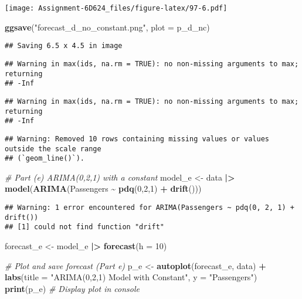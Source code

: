 \documentclass[
]{article}
\newenvironment{Shaded}{\begin{snugshade}}{\end{snugshade}}
\newcommand{\AttributeTok}[1]{\textcolor[rgb]{0.13,0.29,0.53}{#1}}
\newcommand{\CommentTok}[1]{\textcolor[rgb]{0.56,0.35,0.01}{\textit{#1}}}
\newcommand{\DecValTok}[1]{\textcolor[rgb]{0.00,0.00,0.81}{#1}}
\newcommand{\FunctionTok}[1]{\textcolor[rgb]{0.13,0.29,0.53}{\textbf{#1}}}
\newcommand{\NormalTok}[1]{#1}
\newcommand{\OtherTok}[1]{\textcolor[rgb]{0.56,0.35,0.01}{#1}}
\newcommand{\SpecialCharTok}[1]{\textcolor[rgb]{0.81,0.36,0.00}{\textbf{#1}}}
\newcommand{\StringTok}[1]{\textcolor[rgb]{0.31,0.60,0.02}{#1}}
\begin{document}
\texttt{[image: Assignment-6D624\_files/figure-latex/97-6.pdf]}

\begin{Shaded}
\begin{Highlighting}[]
\FunctionTok{ggsave}\NormalTok{(}\StringTok{"forecast\_d\_no\_constant.png"}\NormalTok{, }\AttributeTok{plot =}\NormalTok{ p\_d\_nc)}
\end{Highlighting}
\end{Shaded}

\begin{verbatim}
## Saving 6.5 x 4.5 in image
\end{verbatim}

\begin{verbatim}
## Warning in max(ids, na.rm = TRUE): no non-missing arguments to max; returning
## -Inf
\end{verbatim}

\begin{verbatim}
## Warning in max(ids, na.rm = TRUE): no non-missing arguments to max; returning
## -Inf
\end{verbatim}

\begin{verbatim}
## Warning: Removed 10 rows containing missing values or values outside the scale range
## (`geom_line()`).
\end{verbatim}

\begin{Shaded}
\begin{Highlighting}[]
\CommentTok{\# Part (e) ARIMA(0,2,1) with a constant}
\NormalTok{model\_e }\OtherTok{\textless{}{-}}\NormalTok{ data }\SpecialCharTok{|\textgreater{}} \FunctionTok{model}\NormalTok{(}\FunctionTok{ARIMA}\NormalTok{(Passengers }\SpecialCharTok{\textasciitilde{}} \FunctionTok{pdq}\NormalTok{(}\DecValTok{0}\NormalTok{,}\DecValTok{2}\NormalTok{,}\DecValTok{1}\NormalTok{) }\SpecialCharTok{+} \FunctionTok{drift}\NormalTok{()))}
\end{Highlighting}
\end{Shaded}

\begin{verbatim}
## Warning: 1 error encountered for ARIMA(Passengers ~ pdq(0, 2, 1) + drift())
## [1] could not find function "drift"
\end{verbatim}

\begin{Shaded}
\begin{Highlighting}[]
\NormalTok{forecast\_e }\OtherTok{\textless{}{-}}\NormalTok{ model\_e }\SpecialCharTok{|\textgreater{}} \FunctionTok{forecast}\NormalTok{(}\AttributeTok{h =} \DecValTok{10}\NormalTok{)}

\CommentTok{\# Plot and save forecast (Part e)}
\NormalTok{p\_e }\OtherTok{\textless{}{-}} \FunctionTok{autoplot}\NormalTok{(forecast\_e, data) }\SpecialCharTok{+}
  \FunctionTok{labs}\NormalTok{(}\AttributeTok{title =} \StringTok{"ARIMA(0,2,1) Model with Constant"}\NormalTok{, }\AttributeTok{y =} \StringTok{"Passengers"}\NormalTok{)}
\FunctionTok{print}\NormalTok{(p\_e) }\CommentTok{\# Display plot in console}
\end{Highlighting}
\end{Shaded}
\end{document}
